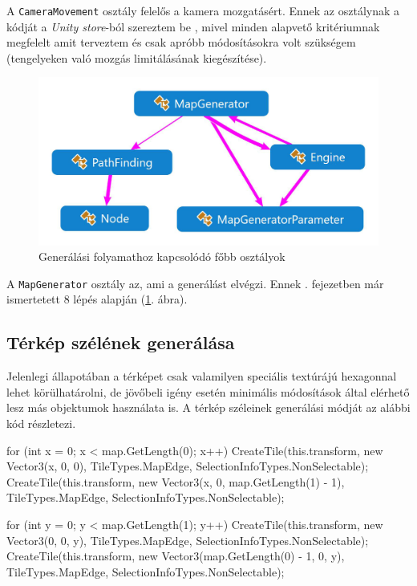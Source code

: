 A \texttt{CameraMovement} osztály felelős a kamera mozgatásért. Ennek az osztálynak a kódját a \textit{Unity store}-ból szereztem be \cite{RTS_Camera}, mivel minden alapvető kritériumnak megfelelt amit terveztem és csak apróbb módosításokra volt szükségem (tengelyeken való mozgás limitálásának kiegészítése). 

\begin{figure}[h!]
\centering
\includegraphics[scale=0.3]{kepek/White_Generalas.JPG}
\caption{Generálási folyamathoz kapcsolódó főbb osztályok}
\label{fig:generalas}
\end{figure}

\newpage

A \texttt{MapGenerator} osztály az, ami a generálást elvégzi. Ennek . fejezetben már ismertetett 8 lépés alapján (\ref{fig:generalas}. ábra).

\subsection{Térkép szélének generálása}

Jelenlegi állapotában a térképet csak valamilyen speciális textúrájú hexagonnal lehet körülhatárolni, de jövőbeli igény esetén minimális módosítások által elérhető lesz más objektumok használata is. A térkép széleinek generálási módját az alábbi kód részletezi.
\begin{cpp}
for (int x = 0; x < map.GetLength(0); x++)
{
   CreateTile(this.transform, new Vector3(x, 0, 0),
   TileTypes.MapEdge, SelectionInfoTypes.NonSelectable);
   CreateTile(this.transform, new Vector3(x, 0, map.GetLength(1) - 1),
   TileTypes.MapEdge, SelectionInfoTypes.NonSelectable);
}

for (int y = 0; y < map.GetLength(1); y++)
{
   CreateTile(this.transform, new Vector3(0, 0, y),
   TileTypes.MapEdge, SelectionInfoTypes.NonSelectable);
   CreateTile(this.transform, new Vector3(map.GetLength(0) - 1, 0, y),
   TileTypes.MapEdge, SelectionInfoTypes.NonSelectable);
}
\end{cpp}

